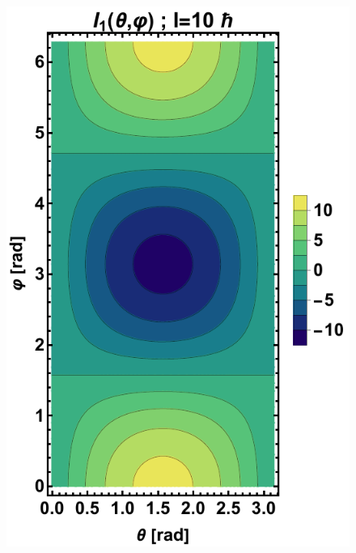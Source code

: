 \begin{figure}
    \centering
    \includegraphics[scale=0.66]{Chapters/Figures/angular_components-TRM-1.pdf}

\end{figure}
